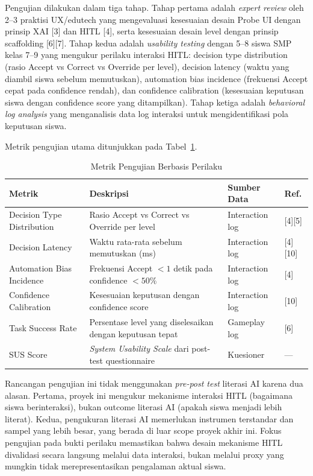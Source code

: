 \documentclass[12pt,oneside]{report}
\begin{document}
Pengujian dilakukan dalam tiga tahap. Tahap pertama adalah \textit{expert review} oleh 2--3 praktisi UX/edutech yang mengevaluasi kesesuaian desain Probe UI dengan prinsip XAI [3] dan HITL [4], serta kesesuaian desain level dengan prinsip scaffolding [6][7]. Tahap kedua adalah \textit{usability testing} dengan 5--8 siswa SMP kelas 7--9 yang mengukur perilaku interaksi HITL: decision type distribution (rasio Accept vs Correct vs Override per level), decision latency (waktu yang diambil siswa sebelum memutuskan), automation bias incidence (frekuensi Accept cepat pada confidence rendah), dan confidence calibration (kesesuaian keputusan siswa dengan confidence score yang ditampilkan). Tahap ketiga adalah \textit{behavioral log analysis} yang menganalisis data log interaksi untuk mengidentifikasi pola keputusan siswa.

Metrik pengujian utama ditunjukkan pada Tabel~\ref{tab:metrik-pengujian}.

\begin{table}[H]
\centering
\caption{Metrik Pengujian Berbasis Perilaku}
\label{tab:metrik-pengujian}
\begin{tabular}{|p{3.5cm}|p{4cm}|p{3cm}|p{2cm}|}
\hline
\textbf{Metrik} & \textbf{Deskripsi} & \textbf{Sumber Data} & \textbf{Ref.} \\ \hline
Decision Type Distribution & Rasio Accept vs Correct vs Override per level & Interaction log & [4][5] \\ \hline
Decision Latency & Waktu rata-rata sebelum memutuskan (ms) & Interaction log & [4][10] \\ \hline
Automation Bias Incidence & Frekuensi Accept $< 1$ detik pada confidence $< 50\%$ & Interaction log & [4] \\ \hline
Confidence Calibration & Kesesuaian keputusan dengan confidence score & Interaction log & [10] \\ \hline
Task Success Rate & Persentase level yang diselesaikan dengan keputusan tepat & Gameplay log & [6] \\ \hline
SUS Score & \textit{System Usability Scale} dari post-test questionnaire & Kuesioner & --- \\ \hline
\end{tabular}
\end{table}

Rancangan pengujian ini tidak menggunakan \textit{pre-post test} literasi AI karena dua alasan. Pertama, proyek ini mengukur mekanisme interaksi HITL (bagaimana siswa berinteraksi), bukan outcome literasi AI (apakah siswa menjadi lebih literat). Kedua, pengukuran literasi AI memerlukan instrumen terstandar dan sampel yang lebih besar, yang berada di luar scope proyek akhir ini. Fokus pengujian pada bukti perilaku memastikan bahwa desain mekanisme HITL divalidasi secara langsung melalui data interaksi, bukan melalui proxy yang mungkin tidak merepresentasikan pengalaman aktual siswa.
\end{document}
